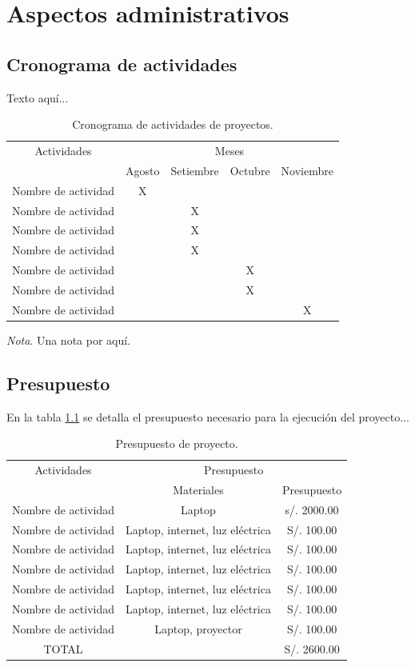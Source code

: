 \documentclass[12pt]{report}
\begin{document}
\chapter{Aspectos administrativos}

\section{Cronograma de actividades}
Texto aquí... 
\begin{table}[htpb]
\centering
\caption{Cronograma de actividades de proyectos.}
\begin{tabular}{ccccc}
\toprule
Actividades & \multicolumn{4}{c}{Meses} \\
&Agosto & Setiembre & Octubre & Noviembre \\
\midrule
Nombre de actividad & X & &  &  \\
Nombre de actividad & & X &  &  \\
Nombre de actividad & & X &  &  \\
Nombre de actividad & & X &  &  \\
Nombre de actividad &  & & X &  \\
Nombre de actividad &  & & X &  \\
Nombre de actividad &  & &  & X \\
\bottomrule
\end{tabular}

\bigskip
\small\textit{Nota}. Una nota por aquí.
\end{table}

\section{Presupuesto}
 En la tabla \ref{table_presu} se detalla el presupuesto necesario para la ejecución del proyecto...
\begin{table}[H]
\centering
\caption{Presupuesto de proyecto.}
\begin{tabular}{ccc}
\toprule
Actividades & \multicolumn{2}{c}{Presupuesto} \\
&Materiales & Presupuesto  \\
\midrule
Nombre de actividad & Laptop & s/. 2000.00 \\
Nombre de actividad & Laptop, internet, luz eléctrica & S/. 100.00  \\
Nombre de actividad &Laptop, internet, luz eléctrica & S/. 100.00  \\
Nombre de actividad & Laptop, internet, luz eléctrica& S/. 100.00   \\
Nombre de actividad & Laptop, internet, luz eléctrica & S/. 100.00  \\
Nombre de actividad & Laptop, internet, luz eléctrica & S/. 100.00 \\
Nombre de actividad & Laptop, proyector &  S/. 100.00\\
TOTAL &  & S/. 2600.00 \\
\bottomrule
\end{tabular}
\bigskip
\label{table_presu}
\end{table}
 
\end{document}
